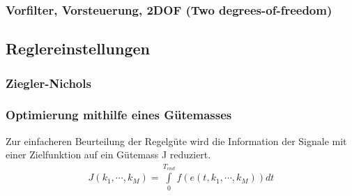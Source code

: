\subsubsection{Vorfilter, Vorsteuerung, 2DOF (Two degrees-of-freedom) }


\subsection{Reglereinstellungen }

\subsubsection{Ziegler-Nichols }

\subsubsection{Optimierung mithilfe eines Gütemasses }

Zur einfacheren Beurteilung der Regelgüte wird die Information der Signale mit einer Zielfunktion auf ein
Gütemass J reduziert.
\begin{eqnarray}
J(k_1,\cdots,k_M)=\int\limits_{0}^{T_{end}}f(e(t,k_1,\cdots,k_M))dt\\
\end{eqnarray}

